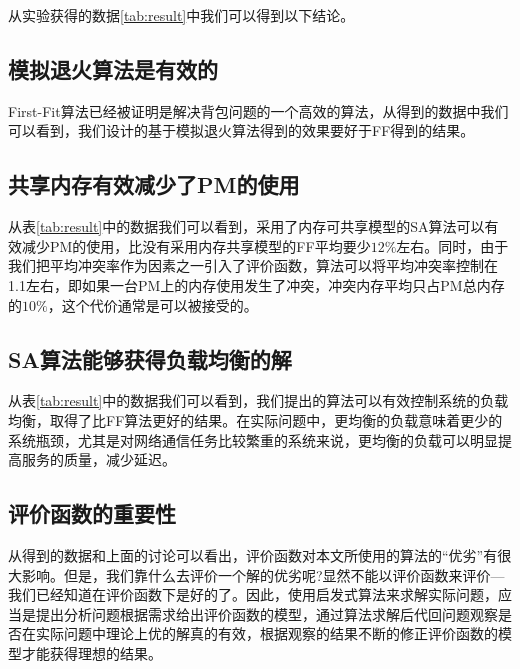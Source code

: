 从实验获得的数据\ref{tab:result}中我们可以得到以下结论。

\subsection*{模拟退火算法是有效的}

First-Fit算法已经被证明是解决背包问题的一个高效的算法，从得到的数据中我们可以看到，我们设计的基于模拟退火算法得到的效果要好于FF得到的结果。

\subsection*{共享内存有效减少了PM的使用}
从表\ref{tab:result}中的数据我们可以看到，采用了内存可共享模型的SA算法可以有效减少PM的使用，比没有采用内存共享模型的FF平均要少$12\%$左右。同时，由于我们把平均冲突率作为因素之一引入了评价函数，算法可以将平均冲突率控制在1.1左右，即如果一台PM上的内存使用发生了冲突，冲突内存平均只占PM总内存的$10\%$，这个代价通常是可以被接受的。

\subsection*{SA算法能够获得负载均衡的解}
从表\ref{tab:result}中的数据我们可以看到，我们提出的算法可以有效控制系统的负载均衡，取得了比FF算法更好的结果。在实际问题中，更均衡的负载意味着更少的系统瓶颈，尤其是对网络通信任务比较繁重的系统来说，更均衡的负载可以明显提高服务的质量，减少延迟。

\subsection*{评价函数的重要性}
从得到的数据和上面的讨论可以看出，评价函数对本文所使用的算法的``优劣''有很大影响。但是，我们靠什么去评价一个解的优劣呢?显然不能以评价函数来评价---我们已经知道在评价函数下是好的了。因此，使用启发式算法来求解实际问题，应当是提出分析问题根据需求给出评价函数的模型，通过算法求解后代回问题观察是否在实际问题中理论上优的解真的有效，根据观察的结果不断的修正评价函数的模型才能获得理想的结果。







